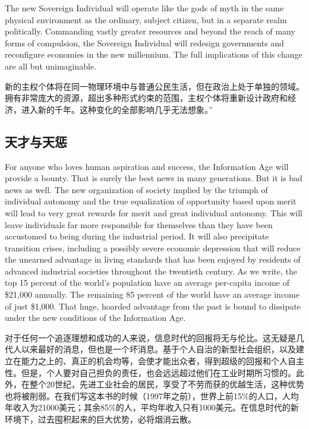 \begin{Parallel}{97mm}{45mm}
  \ParallelPar
  \ParallelLText
  {The new Sovereign Individual will operate like the gods of myth in the same physical environment as the ordinary, subject citizen, but in a separate realm politically. Commanding vastly greater resources and beyond the reach of many forms of compulsion, the Sovereign Individual will redesign governments and reconfigure economies in the new millennium. The full implications of this change are all but unimaginable.}

  \ParallelRText
  {\small 新的主权个体将在同一物理环境中与普通公民生活，但在政治上处于单独的领域。拥有非常庞大的资源，超出多种形式约束的范围，主权个体将重新设计政府和经济，进入新的千年。这种变化的全部影响几乎无法想象。”}

  \ParallelPar

\subsection{天才与天惩}  

  \ParallelLText
  {For anyone who loves human aspiration and success, the Information Age will provide a bounty. That is surely the best news in many generations. But it is bad news as well. The new organization of society implied by the triumph of individual autonomy and the true equalization of opportunity based upon merit will lead to very great rewards for merit and great individual autonomy. This will leave individuals far more responsible for themselves than they have been accustomed to being during the industrial period. It will also precipitate transition crises, including a possibly severe economic depression that will reduce the unearned advantage in living standards that has been enjoyed by residents of advanced industrial societies throughout the twentieth century.  As we write, the top 15 percent of the world's population have an average per-capita income of \$21,000 annually. The remaining 85 percent of the world have an average income of just \$1,000. That huge, hoarded advantage from the past is bound to dissipate under the new conditions of the Information Age.  }
  
  \ParallelRText
  {\small 对于任何一个追逐理想和成功的人来说，信息时代的回报将无与伦比。这无疑是几代人以来最好的消息，但也是一个坏消息。基于个人自治的新型社会组织，以及建立在能力之上的、真正的机会均等，会使才能出众者，得到超级的回报和个人自主性。但是，个人要对自己担负的责任，也会远远超过他们在工业时期所习惯的。此外，在整个20世纪，先进工业社会的居民，享受了不劳而获的优越生活，这种优势也将被削弱。在我们写这本书的时候（1997年之前），世界上前15\%的人口，人均年收入为21000美元；其余85\%的人，平均年收入只有1000美元。在信息时代的新环境下，过去囤积起来的巨大优势，必将烟消云散。 }



\end{Parallel}
